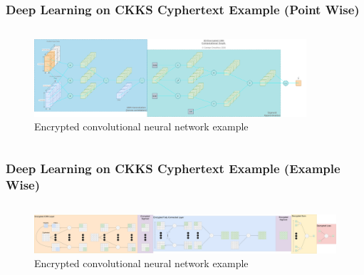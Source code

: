\documentclass[aspectratio=169]{beamer}
\begin{document}
  \begin{frame}
    \frametitle{Deep Learning on CKKS Cyphertext Example (Point Wise)}
    \begin{columns}
      \begin{column}{1\textwidth}
        \begin{figure}[th!]
          \centering
          \includegraphics[width=0.9\textwidth]{encrypted_cnn.png}
          \caption{Encrypted convolutional neural network example \autocite{repository}}
          \label{fig:cnn}
        \end{figure}
      \end{column}
    \end{columns}
  \end{frame}

  \begin{frame}
    \frametitle{Deep Learning on CKKS Cyphertext Example (Example Wise)}
    \begin{columns}
      \begin{column}{1\textwidth}
        \begin{figure}[th!]
          \centering
          \includegraphics[width=1\textwidth]{example_wise_computational_graph.pdf}
          \caption{Encrypted convolutional neural network example \autocite{repository}}
          \label{fig:cnn}
        \end{figure}
      \end{column}
    \end{columns}
  \end{frame}
\end{document}

